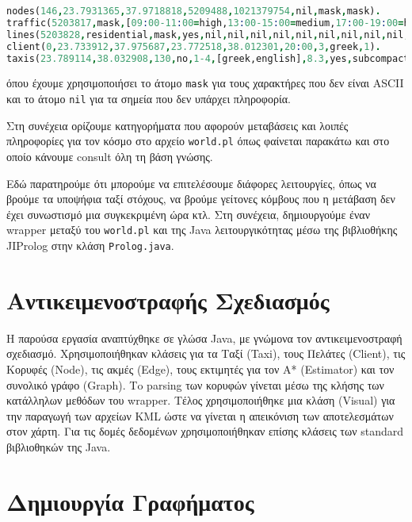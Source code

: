 \documentclass[a4paper,12pt]{article}
\begin{document}
\begin{lstlisting}[language=prolog]
nodes(146,23.7931365,37.9718818,5209488,1021379754,nil,mask,mask).
traffic(5203817,mask,[09:00-11:00=high,13:00-15:00=medium,17:00-19:00=high], mask,mask).
lines(5203828,residential,mask,yes,nil,nil,nil,nil,nil,nil,nil,nil,nil,nil,nil,nil,nil,nil,mask,mask).
client(0,23.733912,37.975687,23.772518,38.012301,20:00,3,greek,1).
taxis(23.789114,38.032908,130,no,1-4,[greek,english],8.3,yes,subcompact,mask).
\end{lstlisting}  

όπου έχουμε χρησιμοποιήσει το άτομο \texttt{mask} για τους χαρακτήρες που δεν είναι ASCII και το άτομο \texttt{nil} για τα σημεία που δεν υπάρχει πληροφορία. 

Στη συνέχεια ορίζουμε κατηγορήματα που αφορούν μεταβάσεις και λοιπές πληροφορίες για τον κόσμο στο αρχείο \texttt{world.pl} όπως φαίνεται παρακάτω και στο οποίο κάνουμε consult όλη τη βάση γνώσης. 



Εδώ παρατηρούμε ότι μπορούμε να επιτελέσουμε διάφορες λειτουργίες, όπως να βρούμε τα υποψήφια ταξί στόχους, να βρούμε γείτονες κόμβους που η μετάβαση δεν έχει συνωστισμό μια συγκεκριμένη ώρα κτλ. Στη συνέχεια, δημιουργούμε έναν wrapper μεταξύ του \texttt{world.pl} και της Java λειτουργικότητας μέσω της βιβλιοθήκης JIProlog στην κλάση \texttt{Prolog.java}. 

\section{Αντικειμενοστραφής Σχεδιασμός} 

Η παρούσα εργασία αναπτύχθηκε σε γλώσα Java, με γνώμονα τον αντικειμενοστραφή σχεδιασμό. Χρησιμοποιήθηκαν κλάσεις για τα Ταξί (Taxi), τους Πελάτες (Client), τις Κορυφές (Node), τις ακμές (Edge), τους εκτιμητές για τον Α* (Estimator) και τον συνολικό γράφο (Graph). Τo parsing των κορυφών γίνεται μέσω της κλήσης των κατάλληλων μεθόδων του wrapper. Τέλος χρησιμοποιήθηκε μια κλάση (Visual) για την παραγωγή των αρχείων KML ώστε να γίνεται η απεικόνιση των αποτελεσμάτων στον χάρτη. Για τις δομές δεδομένων χρησιμοποιήθηκαν επίσης κλάσεις των standard βιβλιοθηκών της Java. 

\section{Δημιουργία Γραφήματος}
\end{document}
